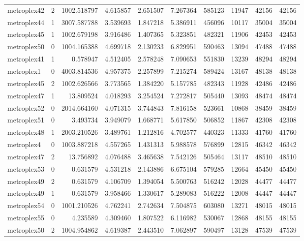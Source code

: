 \documentclass[../../../thesis.tex]{subfiles}
\begin{document}
\begin{longtable}{|l|r|r|r|r|r|r|r|r|r|}
metroplex42 & 2 & 1002.518797 & 4.615857 & 2.651507 & 7.267364 & 585123 & 11947 & 42156 & 42156 \\
metroplex44 & 1 & 3007.587788 & 3.539693 & 1.847218 & 5.386911 & 456096 & 10117 & 35004 & 35004 \\
metroplex45 & 1 & 1002.679198 & 3.916486 & 1.407365 & 5.323851 & 482321 & 11906 & 42453 & 42453 \\
metroplex50 & 0 & 1004.165388 & 4.699718 & 2.130233 & 6.829951 & 590463 & 13094 & 47488 & 47488 \\
metroplex41 & 1 & 0.578947 & 4.512405 & 2.578248 & 7.090653 & 551830 & 13239 & 48294 & 48294 \\
metroplex1 & 0 & 4003.814536 & 4.957375 & 2.257899 & 7.215274 & 589424 & 13167 & 48138 & 48138 \\
metroplex45 & 2 & 1002.626566 & 3.773565 & 1.384220 & 5.157785 & 482343 & 11928 & 42486 & 42486 \\
metroplex47 & 1 & 13.809524 & 4.018293 & 3.254524 & 7.272817 & 505440 & 13093 & 48474 & 48474 \\
metroplex52 & 0 & 2014.664160 & 4.071315 & 3.744843 & 7.816158 & 523661 & 10868 & 38459 & 38459 \\
metroplex51 & 0 & 3.493734 & 3.949079 & 1.668771 & 5.617850 & 506852 & 11867 & 42308 & 42308 \\
metroplex48 & 1 & 2003.210526 & 3.489761 & 1.212816 & 4.702577 & 440323 & 11333 & 41760 & 41760 \\
metroplex4 & 0 & 1003.887218 & 4.557265 & 1.431313 & 5.988578 & 576899 & 12815 & 46342 & 46342 \\
metroplex47 & 2 & 13.756892 & 4.076488 & 3.465638 & 7.542126 & 505464 & 13117 & 48510 & 48510 \\
metroplex53 & 0 & 0.631579 & 4.531218 & 2.143886 & 6.675104 & 579285 & 12664 & 45450 & 45450 \\
metroplex49 & 2 & 0.631579 & 4.106709 & 1.394054 & 5.500763 & 516242 & 12028 & 44477 & 44477 \\
metroplex49 & 1 & 0.631579 & 3.958466 & 1.330617 & 5.289083 & 516222 & 12008 & 44447 & 44447 \\
metroplex54 & 0 & 1001.210526 & 4.762241 & 2.742634 & 7.504875 & 603080 & 13271 & 48015 & 48015 \\
metroplex55 & 0 & 4.235589 & 4.309460 & 1.807522 & 6.116982 & 530067 & 12868 & 48155 & 48155 \\
metroplex50 & 2 & 1004.954862 & 4.619387 & 2.443510 & 7.062897 & 590497 & 13128 & 47539 & 47539 \\

\end{longtable}
\end{document}
